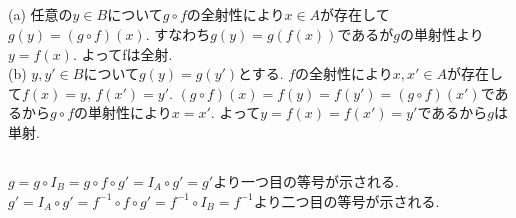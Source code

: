 \documentclass{jsarticle}
\begin{document}
\subsection{} %
\noindent
(a) 任意の$y \in B$について$g \circ f$の全射性により$x \in A$が存在して$g(y) = (g \circ f)(x)$. すなわち$g(y) = g(f(x))$であるが$g$の単射性より$y = f(x)$. よってfは全射.\\
(b) $y, y' \in B$について$g(y) = g(y')$とする. $f$の全射性により$x, x' \in A$が存在して$f(x) = y$, $f(x') = y'$. $(g \circ f)(x) = f(y) = f(y') = (g \circ f)(x')$であるから$g \circ f$の単射性により$x = x'$. よって$y = f(x) = f(x') = y'$であるから$g$は単射.

\subsection{} %
\noindent
$g = g \circ I_B = g \circ f \circ g' = I_A \circ g' = g'$より一つ目の等号が示される.\\
$g' = I_A \circ g' = f^{-1} \circ f \circ g' = f^{-1} \circ I_B = f^{-1}$より二つ目の等号が示される.\\
\end{document}
